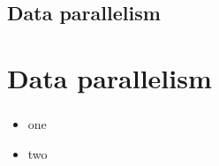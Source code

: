 
\section{Data parallelism}
\chapter{Data parallelism}
\subsection{} %

\begin{frame}{}
  \begin{itemize}\setlength{\itemsep}{3mm}
    \item one
    \item two
  \end{itemize}
\end{frame}
